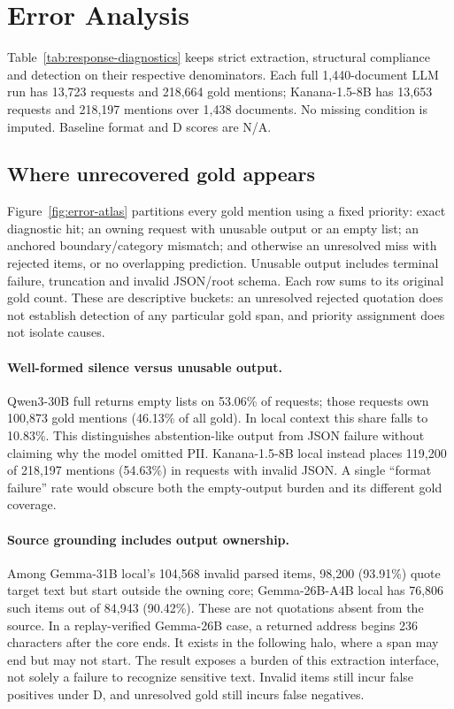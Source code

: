 \section{Error Analysis}
\label{app:diagnostics}
\label{app:result-layout}

Table~\ref{tab:response-diagnostics} keeps strict extraction, structural
compliance and detection on their respective denominators. Each full
1,440-document LLM run has 13,723 requests and 218,664 gold mentions;
Kanana-1.5-8B has 13,653 requests and 218,197 mentions over 1,438 documents.
No missing condition is imputed. Baseline format and D scores are N/A.



\subsection{Where unrecovered gold appears}
Figure~\ref{fig:error-atlas} partitions every gold mention using a fixed
priority: exact diagnostic hit; an owning request with unusable output or
an empty list; an anchored boundary/category mismatch; and otherwise an
unresolved miss with rejected items, or no overlapping prediction.
Unusable output includes terminal failure, truncation and invalid JSON/root
schema. Each row sums to its original gold count. These are descriptive
buckets: an unresolved rejected quotation does not establish detection of
any particular gold span, and priority assignment does not isolate causes.



\paragraph{Well-formed silence versus unusable output.}
Qwen3-30B full returns empty lists on 53.06\% of requests; those requests
own 100,873 gold mentions (46.13\% of all gold). In local context this
share falls to 10.83\%. This distinguishes abstention-like output from
JSON failure without claiming why the model omitted PII. Kanana-1.5-8B
local instead places 119,200 of 218,197 mentions (54.63\%) in requests
with invalid JSON. A single ``format failure'' rate would obscure both
the empty-output burden and its different gold coverage.

\paragraph{Source grounding includes output ownership.}
Among Gemma-31B local's 104,568 invalid parsed items, 98,200 (93.91\%)
quote target text but start outside the owning core; Gemma-26B-A4B local
has 76,806 such items out of 84,943 (90.42\%). These are not quotations
absent from the source. In a replay-verified Gemma-26B case, a returned
address begins 236 characters after the core ends. It exists in the
following halo, where a span may end but may not start. The result exposes
a burden of this extraction interface, not solely a failure to recognize
sensitive text. Invalid items still incur false positives under D, and
unresolved gold still incurs false negatives.

